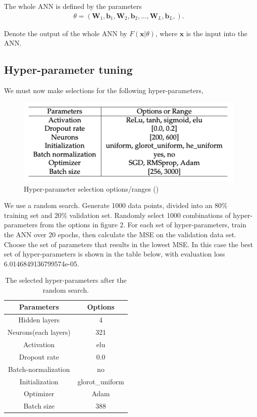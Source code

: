 \documentclass[12pt,a4paper]{article}
\begin{document}
The whole ANN is defined by the parameters
\begin{align}
    \theta = (\mathbf{W}_1, \mathbf{b}_1, \mathbf{W}_2, \mathbf{b}_2,...,\mathbf{W}_L, \mathbf{b}_L,).
\end{align}

Denote the output of the whole ANN by $F(\mathbf{x} | \theta)$, where $\mathbf{x}$ is the input into the ANN.

\subsection{Hyper-parameter tuning}
We must now make selections for the following hyper-parameters,
\begin{figure}[H]
    \centering
    \includegraphics[width=320pt]{hyperparameterRanges.png}
    \caption{Hyper-parameter selection options/ranges (\cite{risks7010016})}
\end{figure}

We use a random search. Generate 1000 data points, divided into an 80\% training set and 20\% validation set. Randomly select 1000 combinations of hyper-parameters from the options in figure 2. For each set of hyper-parameters, train the ANN over 20 epochs, then calculate the MSE on the validation data set. Choose the set of parameters that results in the lowest MSE. In this case the best set of hyper-parameters is shown in the table below, with evaluation loss 6.0146849136799574e-05.

\begin{table}[h!]
\begin{center}
\begin{tabular}{c|c} 
 \hline
 Parameters & Options  \\ [0.5ex] 
 \hline
 Hidden layers & 4   \\ 
 \hline
 Neurons(each layers) & 321  \\
 Activation & elu \\
 Dropout rate & 0.0  \\
 Batch-normalization & no  \\
 Initialization & glorot\_uniform  \\
 Optimizer & Adam  \\
 Batch size & 388  \\ [1ex] 
 \hline
\end{tabular}
\caption{The selected hyper-parameters after the random search.}
\label{table:1}
\end{center}
\end{table}
\end{document}
